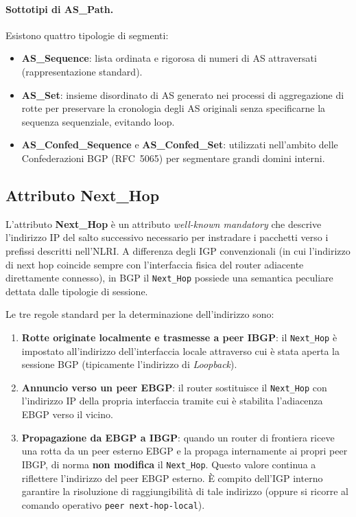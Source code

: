 \documentclass[11pt, a4paper]{article}
\begin{document}
\paragraph{Sottotipi di AS\_Path.}
Esistono quattro tipologie di segmenti:
\begin{itemize}[noitemsep]
    \item \textbf{AS\_Sequence}: lista ordinata e rigorosa di numeri di AS attraversati (rappresentazione standard).
    \item \textbf{AS\_Set}: insieme disordinato di AS generato nei processi di aggregazione di rotte per preservare la cronologia degli AS originali senza specificarne la sequenza sequenziale, evitando loop.
    \item \textbf{AS\_Confed\_Sequence} e \textbf{AS\_Confed\_Set}: utilizzati nell'ambito delle Confederazioni BGP (RFC~5065) per segmentare grandi domini interni.
\end{itemize}

\subsection{Attributo Next\_Hop}

L'attributo \textbf{Next\_Hop} è un attributo \emph{well-known mandatory} che descrive l'indirizzo IP del salto successivo necessario per instradare i pacchetti verso i prefissi descritti nell'NLRI. A differenza degli IGP convenzionali (in cui l'indirizzo di next hop coincide sempre con l'interfaccia fisica del router adiacente direttamente connesso), in BGP il \texttt{Next\_Hop} possiede una semantica peculiare dettata dalle tipologie di sessione.


Le tre regole standard per la determinazione dell'indirizzo sono:
\begin{enumerate}
    \item \textbf{Rotte originate localmente e trasmesse a peer IBGP}: il \texttt{Next\_Hop} è impostato all'indirizzo dell'interfaccia locale attraverso cui è stata aperta la sessione BGP (tipicamente l'indirizzo di \emph{Loopback}).
    \item \textbf{Annuncio verso un peer EBGP}: il router sostituisce il \texttt{Next\_Hop} con l'indirizzo IP della propria interfaccia tramite cui è stabilita l'adiacenza EBGP verso il vicino.
    \item \textbf{Propagazione da EBGP a IBGP}: quando un router di frontiera riceve una rotta da un peer esterno EBGP e la propaga internamente ai propri peer IBGP, di norma \textbf{non modifica} il \texttt{Next\_Hop}. Questo valore continua a riflettere l'indirizzo del peer EBGP esterno. È compito dell'IGP interno garantire la risoluzione di raggiungibilità di tale indirizzo (oppure si ricorre al comando operativo \texttt{peer next-hop-local}).
\end{enumerate}
\end{document}
